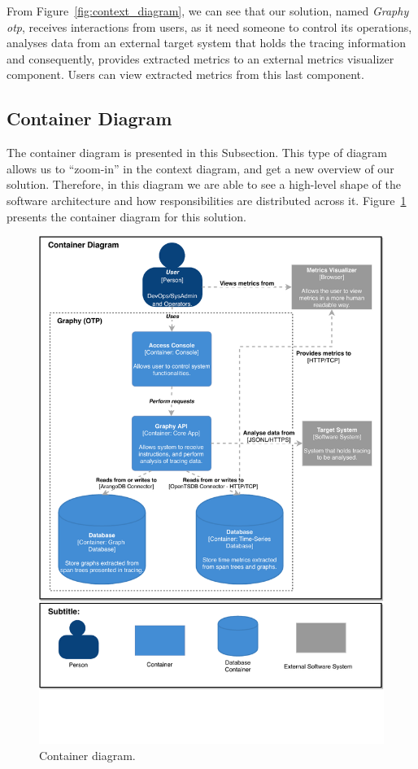 From Figure~\ref{fig:context_diagram}, we can see that our solution, named \emph{Graphy \gls{otp}}, receives interactions from users, as it need someone to control its operations, analyses data from an external target system that holds the tracing information and consequently, provides extracted metrics to an external metrics visualizer component. Users can view extracted metrics from this last component.

\subsection{Container Diagram}
\label{subsec:container_diagram}

The container diagram is presented in this Subsection. This type of diagram allows us to ``zoom-in'' in the context diagram, and get a new overview of our solution. Therefore, in this diagram we are able to see a high-level shape of the software architecture and how responsibilities are distributed across it. Figure~\ref{fig:container_diagram} presents the container diagram for this solution.

\begin{figure}[H]
    \centering
    \includegraphics[width=1.00\textwidth]{images/container_diagram.pdf}
    \caption{Container diagram.}
    \label{fig:container_diagram}
\end{figure}

